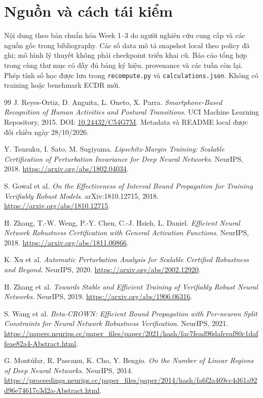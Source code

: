 \documentclass[11pt,a4paper]{article}
\newcommand{\code}[1]{{\small\ttfamily\nolinkurl{#1}}}
\theoremstyle{remark}
\begin{document}
\section*{Nguồn và cách tái kiểm}
Nội dung theo bản chuẩn hóa Week 1--3 do người nghiên cứu cung cấp và các
nguồn gốc trong bibliography. Các số data mô tả snapshot local theo policy
đã ghi; mô hình lý thuyết không phải checkpoint triển khai cũ. Báo cáo tổng
hợp trong cùng thư mục có đầy đủ bảng ký hiệu, provenance và các tuần còn
lại. Phép tính số học được lưu trong \code{recompute.py} và
\code{calculations.json}. Không có training hoặc benchmark ECDR mới.

\begingroup\small
\begin{thebibliography}{99}
 J. Reyes-Ortiz, D. Anguita, L. Oneto, X. Parra.
\emph{Smartphone-Based Recognition of Human Activities and Postural
Transitions}. UCI Machine Learning Repository, 2015.
DOI: \href{https://doi.org/10.24432/C54G7M}{10.24432/C54G7M}.
Metadata và README local được đối chiếu ngày 28/10/2026.

 Y. Tsuzuku, I. Sato, M. Sugiyama.
\emph{Lipschitz-Margin Training: Scalable Certification of Perturbation
Invariance for Deep Neural Networks}. NeurIPS, 2018.
\url{https://arxiv.org/abs/1802.04034}.

 S. Gowal et al.
\emph{On the Effectiveness of Interval Bound Propagation for Training
Verifiably Robust Models}. arXiv:1810.12715, 2018.
\url{https://arxiv.org/abs/1810.12715}.

 H. Zhang, T.-W. Weng, P.-Y. Chen, C.-J. Hsieh, L. Daniel.
\emph{Efficient Neural Network Robustness Certification with General
Activation Functions}. NeurIPS, 2018.
\url{https://arxiv.org/abs/1811.00866}.

 K. Xu et al.
\emph{Automatic Perturbation Analysis for Scalable Certified Robustness
and Beyond}. NeurIPS, 2020.
\url{https://arxiv.org/abs/2002.12920}.

 H. Zhang et al.
\emph{Towards Stable and Efficient Training of Verifiably Robust Neural
Networks}. NeurIPS, 2019.
\url{https://arxiv.org/abs/1906.06316}.

 S. Wang et al.
\emph{Beta-CROWN: Efficient Bound Propagation with Per-neuron Split
Constraints for Neural Network Robustness Verification}. NeurIPS, 2021.
\url{https://papers.neurips.cc/paper_files/paper/2021/hash/fac7fead96dafceaf80c1daffeae82a4-Abstract.html}.

 G. Mont\'ufar, R. Pascanu, K. Cho, Y. Bengio.
\emph{On the Number of Linear Regions of Deep Neural Networks}.
NeurIPS, 2014.
\url{https://proceedings.neurips.cc/paper_files/paper/2014/hash/fa6f2a469cc4d61a92d96e74617c3d2a-Abstract.html}.


\end{thebibliography}
\end{document}
